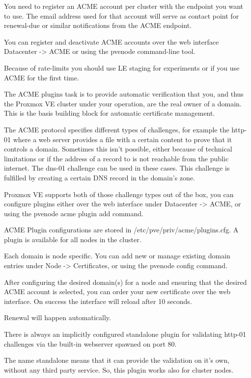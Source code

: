 You need to register an ACME account per cluster with the endpoint you want to use. The email address used for that account will serve as contact point for renewal-due or similar notifications from the ACME endpoint.

You can register and deactivate ACME accounts over the web interface Datacenter -> ACME or using the pvenode command-line tool.

Because of rate-limits you should use LE staging for experiments or if you use ACME for the first time.

The ACME plugins task is to provide automatic verification that you, and thus the Proxmox VE cluster under your operation, are the real owner of a domain. This is the basis building block for automatic certificate management.

The ACME protocol specifies different types of challenges, for example the http-01 where a web server provides a file with a certain content to prove that it controls a domain. Sometimes this isn’t possible, either because of technical limitations or if the address of a record to is not reachable from the public internet. The dns-01 challenge can be used in these cases. This challenge is fulfilled by creating a certain DNS record in the domain’s zone.

Proxmox VE supports both of those challenge types out of the box, you can configure plugins either over the web interface under Datacenter -> ACME, or using the pvenode acme plugin add command.

ACME Plugin configurations are stored in /etc/pve/priv/acme/plugins.cfg. A plugin is available for all nodes in the cluster.

Each domain is node specific. You can add new or manage existing domain entries under Node -> Certificates, or using the pvenode config command.

After configuring the desired domain(s) for a node and ensuring that the desired ACME account is selected, you can order your new certificate over the web interface. On success the interface will reload after 10 seconds.

Renewal will happen automatically.

There is always an implicitly configured standalone plugin for validating http-01 challenges via the built-in webserver spawned on port 80.

The name standalone means that it can provide the validation on it’s own, without any third party service. So, this plugin works also for cluster nodes.

